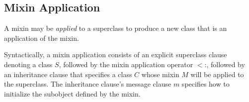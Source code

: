 \documentclass{article}
\newcommand{\code}[1]{{\sf #1}}
\begin{document}

%
%
%
%
%

\subsection{Mixin Application}
\label{mixinApplication}

A mixin may be {\em applied} to a  superclass to produce a new class that is an application of the mixin. 

Syntactically, a mixin application consists of an explicit superclass clause denoting a class $S$, followed by the
mixin application operator \code{$<$:},  followed by an inheritance clause that
specifies a class $C$ whose mixin $M$ will be applied to the superclass. The inheritance clause's message clause $m$  specifies how to initialize the
subobject defined by the mixin.


 
\end{document}
